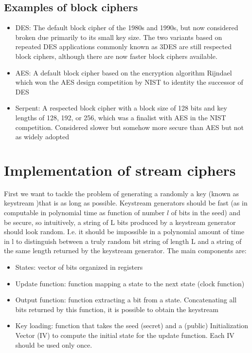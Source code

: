 \subsection{Examples of block ciphers}

\begin{itemize}
	\item DES: The default block cipher of the 1980s and 1990s, but now considered broken due primarily to its small key size. The two variants based on repeated DES applications commonly known as 3DES are still respected block ciphers, although there are now faster block ciphers available.
	\item AES: A default block cipher based on the encryption algorithm Rijndael which won the AES design competition by NIST to identity the successor of DES
	\item Serpent: A respected block cipher with a block size of 128 bits and key lengths of 128, 192, or 256, which was a finalist with AES in the NIST competition. Considered slower but somehow more secure than AES but not as widely adopted
\end{itemize}

\section{Implementation of stream ciphers}

First we want to tackle the problem of generating a randomly a key (known as keystream )that is as long as possible. Keystream generators should be fast (as in computable in polynomial time as function of number $l$ of bits in the seed) and be secure, so intuitively, a string of L bits produced by a keystream generator should look random. I.e. it should be impossible in a polynomial amount of time in l to distinguish between a truly random bit string of length L and a string of the same length returned by the keystream generator. The main components are:
\begin{itemize}
	\item States: vector of bits organized in registers
	\item Update function: function mapping a state to the next state (clock function)
	\item Output function: function extracting a bit from a state. Concatenating all bits returned by this function, it is possible to obtain the keystream
	\item Key loading: function that takes the seed (secret) and a (public) Initialization Vector (IV) to compute the initial state for the update function. Each IV should be used only once.
\end{itemize}

